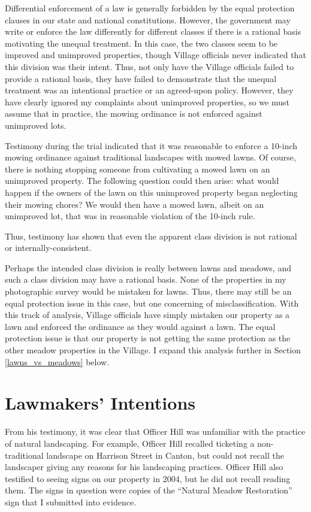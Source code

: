 \documentclass[12pt]{article}
\begin{document}
Differential enforcement of a law is generally forbidden by the equal protection clauses in our state and national constitutions.
However, the government may write or enforce the law differently for different classes if there is a rational basis motivating the unequal treatment.
In this case, the two classes seem to be improved and unimproved properties, though Village officials never indicated that this division was their intent.
Thus, not only have the Village officials failed to provide a rational basis, they have failed to demonstrate that the unequal treatment was an intentional practice or an agreed-upon policy.
However, they have clearly ignored my complaints about unimproved properties, so we must assume that in practice, the mowing ordinance is not enforced against unimproved lots. 

Testimony during the trial indicated that it was reasonable to enforce a 10-inch mowing ordinance against traditional landscapes with mowed lawns.
Of course, there is nothing stopping someone from cultivating a mowed lawn on an unimproved property.
The following question could then arise:  what would happen if the owners of the lawn on this unimproved property began neglecting their mowing chores?
We would then have a mowed lawn, albeit on an unimproved lot, that was in reasonable violation of the 10-inch rule.

Thus, testimony has shown that even the apparent class division is not rational or internally-consistent. 

Perhaps the intended class division is really between lawns and meadows, and such a class division may have a rational basis.
None of the properties in my photographic survey would be mistaken for lawns.
Thus, there may still be an equal protection issue in this case, but one concerning of misclassification.
With this track of analysis, Village officials have simply mistaken our property as a lawn and enforced the ordinance as they would against a lawn.
The equal protection issue is that our property is not getting the same protection as the other meadow properties in the Village.
I expand this analysis further in Section \ref{lawns_vs_meadows} below.



\section{Lawmakers' Intentions}

From his testimony, it was clear that Officer Hill was unfamiliar with the practice of natural landscaping.
For example, Officer Hill recalled ticketing a non-traditional landscape on Harrison Street in Canton, but could not recall the landscaper giving any reasons for his landscaping practices.
Officer Hill also testified to seeing signs on our property in 2004, but he did not recall reading them.
The signs in question were copies of the ``Natural Meadow Restoration'' sign that I submitted into evidence.
\end{document}
